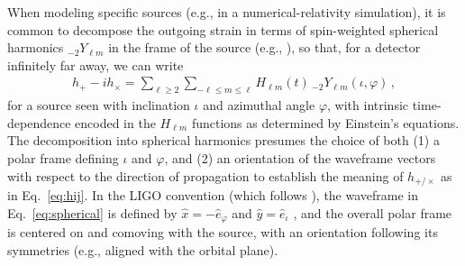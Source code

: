 \documentclass[aps,prd,twocolumn,superscriptaddress,preprintnumbers,floatfix,nofootinbib]{revtex4-2}
\newcommand*{\eq}[1]{Eq.~\eqref{eq:#1}}
\begin{document}
When modeling specific sources (e.g., in a numerical-relativity simulation), it is common to decompose the outgoing strain in terms of spin-weighted spherical harmonics ${}_{-2} Y_{\ell m}$ in the frame of the source (e.g., \cite{Kidder:2007rt}), so that, for a detector infinitely far away, we can write
\begin{align} \label{eq:spherical}
h_+ - i h_\times = \sum_{\ell \geq 2} \sum_{-\ell \leq m \leq \ell} H_{\ell m}(t)\, {}_{-2}Y_{\ell m} (\iota, \varphi)\, ,
\end{align}
for a source seen with inclination $\iota$ and azimuthal angle $\varphi$, with intrinsic time-dependence encoded in the $H_{\ell m}$ functions as determined by Einstein's equations.
The decomposition into spherical harmonics presumes the choice of both (1) a polar frame defining $\iota$ and $\varphi$, and (2) an orientation of the waveframe vectors with respect to the direction of propagation to establish the meaning of $h_{+/\times}$ as in \eq{hij}.
In the LIGO convention (which follows \cite{Blanchet:2008je,Faye:2012we}), the waveframe in \eq{spherical} is defined by $\hat{x} = - \hat{e}_\varphi$ and $\hat{y} = \hat{e}_\iota$ \cite{LALSuite:source}, and the overall polar frame is centered on and comoving with the source, with an orientation following its symmetries (e.g., aligned with the orbital plane).
\end{document}
